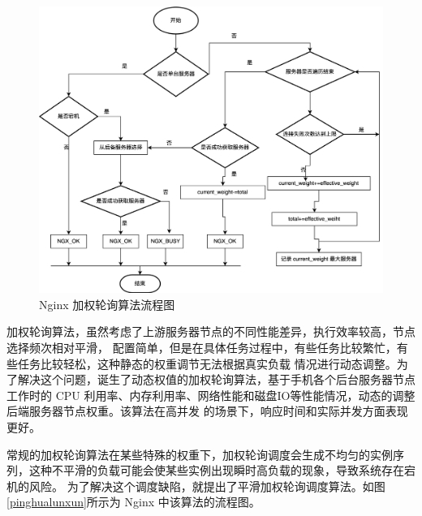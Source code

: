 \begin{figure}[htb]
  \centering
  \includegraphics[width=\textwidth]{figures/round-flowchart.png}
  \caption{Nginx 加权轮询算法流程图}
  \label{weight_round}
\end{figure}

加权轮询算法，虽然考虑了上游服务器节点的不同性能差异，执行效率较高，节点选择频次相对平滑，
配置简单，但是在具体任务过程中，有些任务比较繁忙，有些任务比较轻松，这种静态的权重调节无法根据真实负载
情况进行动态调整。为了解决这个问题，诞生了动态权值的加权轮询算法，基于手机各个后台服务器节点工作时的 CPU
利用率、内存利用率、网络性能和磁盘IO等性能情况，动态的调整后端服务器节点权重\cite{谭畅2021云中心基于}。该算法在高并发
的场景下，响应时间和实际并发方面表现更好。

常规的加权轮询算法在某些特殊的权重下，加权轮询调度会生成不均匀的实例序列，这种不平滑的负载可能会使某些实例出现瞬时高负载的现象，导致系统存在宕机的风险。
为了解决这个调度缺陷，就提出了平滑加权轮询调度算法。如图\ref{pinghualunxun}所示为 Nginx 中该算法的流程图。

